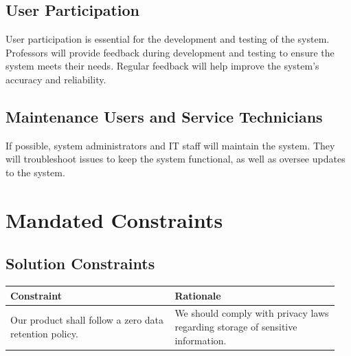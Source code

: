 \documentclass[12pt]{article}
\begin{document}
\subsection{User Participation}
User participation is essential for the development and testing of the system.
Professors will provide feedback during development and testing to ensure the
system meets their needs. Regular feedback will help improve the system's
accuracy and reliability.

\subsection{Maintenance Users and Service Technicians}
If possible, system administrators and IT staff will maintain the system. They
will troubleshoot issues to keep the system functional, as well as oversee
updates to the system.


\section{Mandated Constraints}
\subsection{Solution Constraints}
\begin{table}[h!]
    \centering
    \begin{tabular}{| p{0.475\linewidth} | p{0.475\linewidth} |}
    \hline
    \textbf{Constraint}   & \textbf{Rationale} \\
    \hline
    Our product shall follow a zero data retention policy. &
    We should comply with privacy laws regarding storage of sensitive information. \\
    \hline
    \end{tabular}
\end{table}
\end{document}

